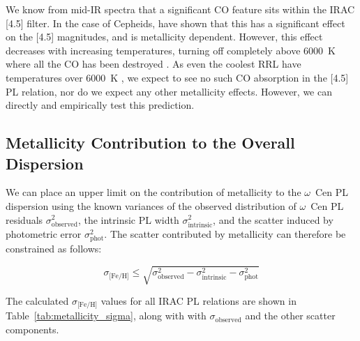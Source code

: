 \documentclass[a4paper,fleqn,usenatbib]{mnras}
\begin{document}
We know from mid-IR spectra that a significant CO feature sits within the IRAC [4.5] filter. In the case of Cepheids, \citet{arxiv:1603.03776} have shown that this has a significant effect on the [4.5] magnitudes, and is metallicity dependent. However, this effect decreases with increasing temperatures, turning off completely above 6000~K where all the CO has been destroyed \citep{arxiv:1603.03776}. As even the coolest RRL have temperatures over 6000~K \citep{1971PASP...83..697I}, we expect to see no such CO absorption in the [4.5] PL relation, nor do we expect any other metallicity effects. However, we can directly and empirically test this prediction. %

\subsection{Metallicity Contribution to the Overall Dispersion}
\label{sec:dispersions}

We can place an upper limit on the contribution of metallicity to the $\omega$~Cen PL dispersion using the known variances of the observed distribution of $\omega$~Cen PL residuals $\sigma_{\text{observed}}^2$, the intrinsic PL width $\sigma_{\text{intrinsic}}^2$, and the scatter induced by photometric error $\sigma_{\text{phot}}^2$. The scatter contributed by metallicity can therefore be constrained as follows:

\begin{equation}
\sigma_\text{[Fe/H]} \leq \sqrt{\sigma_{\text{observed}}^2 - \sigma_{\text{intrinsic}}^2 - \sigma_{\text{phot}}^2}
\end{equation}

The calculated $\sigma_\text{[Fe/H]}$ values for all IRAC PL relations are shown in Table~\ref{tab:metallicity_sigma}, along with with $\sigma_{\text{observed}}$ and the other scatter components.
\end{document}

